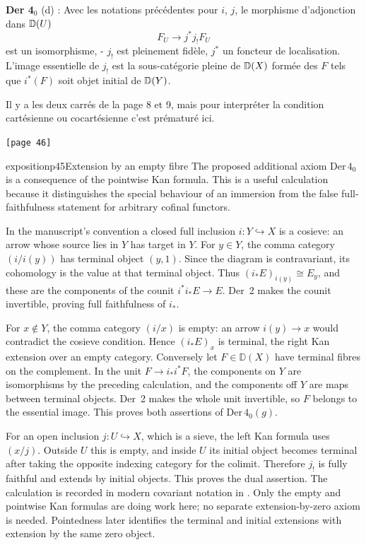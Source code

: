 \noindent\textbf{Der 4}$_{0}$ (d) : Avec les notations précédentes pour $i$, $j$, le morphisme d'adjonction dans $\mathbb{D}(U)$
\[ F_{U} \longrightarrow j^{*} j_{!} F_{U} \]
est un isomorphisme, - $j_{!}$ est pleinement fidèle, $j^{*}$ un foncteur de localisation. L'image essentielle de $j_{!}$ est la sous-catégorie pleine de $\mathbb{D}(X)$ formée des $F$ tels que $i^{*}(F)$ soit objet initial de $\mathbb{D}(Y)$.

Il y a les deux carrés de la page 8 et 9, mais pour interpréter la condition cartésienne ou cocartésienne c'est prématuré ici.

\noindent{}\texttt{[page 46]}

\begin{dcomment}{exposition}{p45}{Extension by an empty fibre}
The proposed additional axiom $\mathrm{Der}\,4_0$ is a consequence of
the pointwise Kan formula. This is a useful calculation because it
distinguishes the special behaviour of an immersion from the false
full-faithfulness statement for arbitrary cofinal functors.

In the manuscript's convention a closed full inclusion
$i:Y\hookrightarrow X$ is a cosieve: an arrow whose source lies in
$Y$ has target in $Y$. For $y\in Y$, the comma category
$(i/i(y))$ has terminal object $(y,1)$. Since the diagram is
contravariant, its cohomology is the value at that terminal object.
Thus $(i_*E)_{i(y)}\cong E_y$, and these are the components of the
counit $i^*i_*E\to E$. Der~2 makes the counit invertible, proving
full faithfulness of $i_*$.

For $x\notin Y$, the comma category $(i/x)$ is empty: an arrow
$i(y)\to x$ would contradict the cosieve condition. Hence
$(i_*E)_x$ is terminal, the right Kan extension over an empty category.
Conversely let $F\in\mathbb D(X)$ have terminal fibres on the
complement. In the unit $F\to i_*i^*F$, the components on $Y$ are
isomorphisms by the preceding calculation, and the components off $Y$
are maps between terminal objects. Der~2 makes the whole unit
invertible, so $F$ belongs to the essential image. This proves both
assertions of $\mathrm{Der}\,4_0(g)$.

For an open inclusion $j:U\hookrightarrow X$, which is a sieve, the
left Kan formula uses $(x/j)$. Outside $U$ this is empty, and inside
$U$ its initial object becomes terminal after taking the opposite
indexing category for the colimit. Therefore $j_!$ is fully faithful
and extends by initial objects. This proves the dual assertion.
The calculation is recorded in modern covariant notation in
\citet[Proposition~1.23]{Groth2013}. Only the empty and pointwise
Kan formulas are doing work here; no separate extension-by-zero axiom
is needed. Pointedness later identifies the terminal and initial
extensions with extension by the same zero object.
\end{dcomment}


